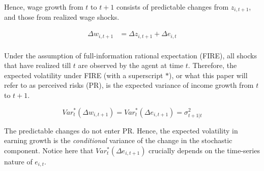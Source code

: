 Hence, wage growth from \(t\) to \(t+1\) consists of predictable changes from
$z_{i,t+1}$, and those from realized wage shocks.

\begin{equation}
\begin{split}
\label{Eq:IncProcess1}
\Delta w_{i,t+1} & =  \Delta z_{i,t+1} + \Delta e_{i,t} \\
\end{split}
\end{equation}

Under the assumption of full-information rational expectation (FIRE), all shocks that have realized till \(t\) are observed by the agent at
time \(t\). Therefore, the expected volatility under FIRE (with a superscript $*$), or what this paper will refer to as perceived risks (PR), is the expected
variance of income growth from \(t\) to \(t+1\).

\begin{equation}
Var_{t}^*(\Delta w_{i,t+1}) =Var_{t}^*(\Delta e_{i,t+1}) =\sigma^2_{t+1|t}
\end{equation}

The predictable changes do not enter PR. Hence, the expected volatility in earning growth is the \emph{conditional} variance of the change in the stochastic component. Notice here that $Var_{t}^*(\Delta e_{i,t+1})$ crucially depends on the time-series nature of $e_{i,t}$.



\begin{comment}
Under FIRE, there are a number of testable predictions about the patterns of
perceived risks.

\begin{itemize}
\item
  \textbf{No within-group disagreement}. First, agents who share the same income process have no disagreements
  on perceived risks. This can be checked by comparing
  within-cohort/group dispersion in perceived risks.
\item
  \textbf{State-independence}. Second, the perceived risks under such the assumed process above are
  not dependent on past/recent income realizations. To put it differently, there is no correlation between realized shocks and the perceived risks. This can be tested
  by estimating the correlation between perceived risks and past income
  realizations or their proxies if the latter is not directly observed. 
\item
  \textbf{Correct decomposition}. Third, under the assumed progress, the variances of permanent and transitory
  shocks enter perceived risks with loading of 1.
\end{itemize}

\end{comment}

